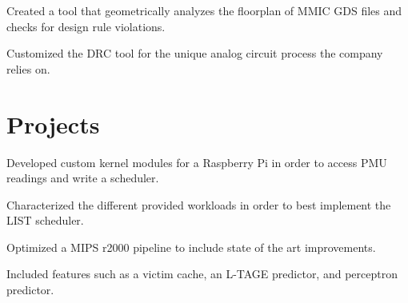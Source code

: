 \documentclass[]{deedy-resume-openfont}
\begin{document}
\begin{tightemize}
\item  Created a tool that geometrically analyzes the floorplan of MMIC GDS files and checks for design rule violations.
\item Customized the DRC tool for the unique analog circuit process the company relies on.
\end{tightemize}
\sectionsep


\section{Projects}

\begin{tightemize}
\item Developed custom kernel modules for a Raspberry Pi in order to access PMU readings and write a scheduler.
\item Characterized the different provided workloads in order to best implement the LIST scheduler.
\end{tightemize}
\sectionsep
%
%
%
%
\begin{tightemize}
\item Optimized a MIPS r2000 pipeline to include state of the art improvements.
\item Included features such as a victim cache, an L-TAGE predictor, and perceptron predictor.
\end{tightemize}
\sectionsep
\end{document}

